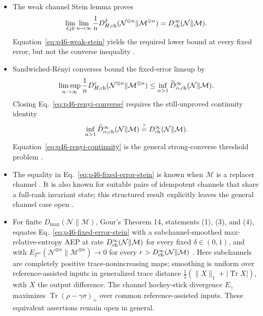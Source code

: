 \begin{itemize}
  \item The weak channel Stein lemma proves
  \begin{equation}
    \lim_{\delta\downarrow0}\lim_{n\to\infty}\frac1n
    D_{H,{\rm ch}}^\delta
    (\mathcal N^{\otimes n}\|\mathcal M^{\otimes n})
    =D_{\rm ch}^{\infty}(\mathcal N\|\mathcal M).
    \label{eq:p46-weak-stein}
  \end{equation}
  Equation~\eqref{eq:p46-weak-stein} yields the required lower bound at
  every fixed error, but not the converse inequality
  .

  \item Sandwiched-R\'enyi converses bound the fixed-error limsup by
  \begin{equation}
    \limsup_{n\to\infty}\frac1nD_{H,{\rm ch}}^\varepsilon
    (\mathcal N^{\otimes n}\|\mathcal M^{\otimes n})
    \leq\inf_{\alpha>1}
    \widetilde D_{\alpha,{\rm ch}}^\infty(\mathcal N\|\mathcal M).
    \label{eq:p46-renyi-converse}
  \end{equation}
  Closing Eq.~\eqref{eq:p46-renyi-converse} requires the still-unproved
  continuity identity
  \begin{equation}
    \inf_{\alpha>1}\widetilde D_{\alpha,{\rm ch}}^\infty
       (\mathcal N\|\mathcal M)
    \stackrel{?}{=}D_{\rm ch}^\infty(\mathcal N\|\mathcal M).
    \label{eq:p46-renyi-continuity}
  \end{equation}
  Equation~\eqref{eq:p46-renyi-continuity} is the general strong-converse
  threshold problem .

  \item The equality in Eq.~\eqref{eq:p46-fixed-error-stein} is known when
  $\mathcal M$ is a replacer channel
  .  It is also known for
  suitable pairs of idempotent channels that share a full-rank invariant
  state; this structured result explicitly leaves the general channel case
  open .

  \item For finite $D_{\max}(\mathcal N\|\mathcal M)$, Gour's Theorem 14,
  statements (1), (3), and (4), equates Eq.~\eqref{eq:p46-fixed-error-stein}
  with a subchannel-smoothed max-relative-entropy AEP at rate
  $D_{\rm ch}^{\infty}(\mathcal N\|\mathcal M)$ for every fixed
  $\delta\in(0,1)$, and with
  $E_{2^{nr}}(\mathcal N^{\otimes n}\|\mathcal M^{\otimes n})\to0$ for
  every $r>D_{\rm ch}^{\infty}(\mathcal N\|\mathcal M)$
  .  Here subchannels are completely
  positive trace-nonincreasing maps; smoothing is uniform over
  reference-assisted inputs in generalized trace distance
  $\tfrac12(\|X\|_1+|\operatorname{Tr}X|)$, with $X$ the output difference.
  The channel hockey-stick divergence $E_\gamma$ maximizes
  $\operatorname{Tr}(\rho-\gamma\sigma)_+$ over common reference-assisted
  inputs.  These equivalent assertions remain open in general.


\end{itemize}
